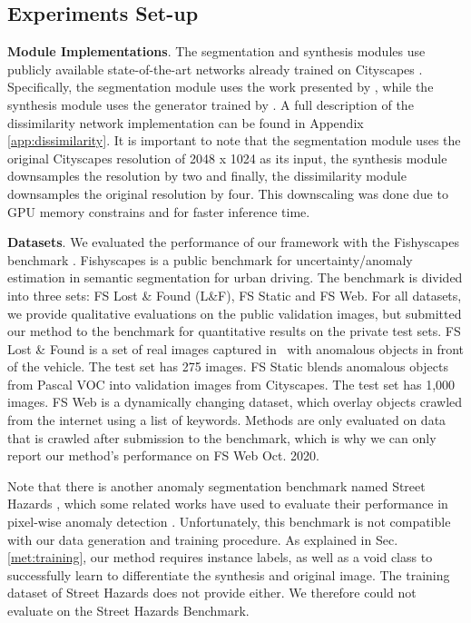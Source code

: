\documentclass[final]{cvpr}
\begin{document}
\subsection{Experiments Set-up}


\label{exp:set_up}

\textbf{Module Implementations}. The segmentation and synthesis modules use publicly available state-of-the-art networks already trained on Cityscapes \cite{Cityscapes}. Specifically, the segmentation module uses the work presented by \cite{DeepLabV3+Label}, while the synthesis module uses the generator trained by \cite{ccfpse}. A full description of the dissimilarity network implementation can be found in Appendix \ref{app:dissimilarity}. It is important to note that the segmentation module uses the original Cityscapes resolution of 2048 x 1024 as its input, the synthesis module downsamples the resolution by two and finally, the dissimilarity module downsamples the original resolution by four. This downscaling was done due to GPU memory constrains and for faster inference time. 

\textbf{Datasets}. We evaluated the performance of our framework with the Fishyscapes benchmark \cite{fishyscapes}. Fishyscapes is a public benchmark for uncertainty/anomaly estimation in semantic segmentation for urban driving. The benchmark is divided into three sets: FS Lost \& Found (L\&F), FS Static and FS Web. For all datasets, we provide qualitative evaluations on the public validation images, but submitted our method to the benchmark for quantitative results on the private test sets.
FS Lost \& Found is a set of real images captured in~\cite{LostFound} with anomalous objects in front of the vehicle. The test set has 275 images.
FS Static blends anomalous objects from Pascal VOC \cite{pascal-voc} into validation images from Cityscapes. The test set has 1,000 images.
FS Web is a dynamically changing dataset, which overlay objects crawled from the internet using a list of keywords. Methods are only evaluated on data that is crawled after submission to the benchmark, which is why we can only report our method's performance on FS Web Oct. 2020.  

Note that there is another anomaly segmentation benchmark named Street Hazards \cite{streethazards}, which some related works have used to evaluate their performance in pixel-wise anomaly detection \cite{synthesize_compare}. Unfortunately, this benchmark is not compatible with our data generation and training procedure. As explained in Sec. \ref{met:training}, our method requires instance labels, as well as a void class to successfully learn to differentiate the synthesis and original image. The training dataset of Street Hazards  does not provide either. We therefore could not evaluate on the Street Hazards Benchmark.
\end{document}
